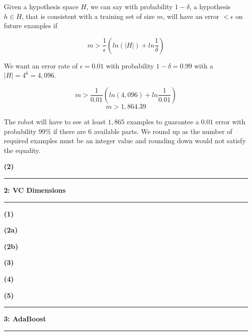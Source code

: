\documentclass[11pt]{article}
\newcommand\question[2]{\vspace{.25in}\hrule\textbf{#1: #2}\vspace{.5em}\hrule\vspace{.10in}}
\renewcommand\part[1]{\vspace{.10in}\textbf{(#1)}}
\begin{document}
Given a hypothesis space $H$, we can say with probability $1 - \delta$, a hypothesis $h \in H$, that is consistent with a training set of size $m$, will have an error $< \epsilon$ on future examples if

$$m > \frac{1}{\epsilon}(ln(|H|) + ln\frac{1}{\delta})$$

We want an error rate of $\epsilon = 0.01$ with probability $1 - \delta = 0.99$ with a $|H| = 4^6 = 4,096$.

$$m > \frac{1}{0.01}(ln(4,096) + ln\frac{1}{0.01})$$
$$m > 1,864.39$$

The robot will have to see at least $1,865$ examples to guarantee a $0.01$ error with probability $99\%$ if there are 6 available parts. We round up as the number of required examples must be an integer value and rounding down would not satisfy the equality.

\newpage
\part{2}

\question{2}{VC Dimensions}

\part{1}

\part{2a}

\part{2b}

\part{3}

\part{4}

\part{5}

\question{3}{AdaBoost}
\end{document}
